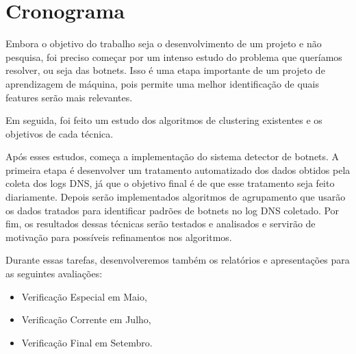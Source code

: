 \chapter{Cronograma}
Embora o objetivo do trabalho seja o desenvolvimento de um projeto e não pesquisa, foi preciso começar por um intenso estudo do problema que queríamos resolver, ou seja das botnets. Isso é uma etapa importante de um projeto de aprendizagem de máquina, pois permite uma melhor identificação de quais features serão mais relevantes.

Em seguida, foi feito um estudo dos algoritmos de clustering existentes e os objetivos de cada técnica.

Após esses estudos, começa a implementação do sistema detector de botnets. A primeira etapa é desenvolver um tratamento automatizado dos dados obtidos pela coleta dos logs DNS, já que o objetivo final é de que esse tratamento seja feito diariamente. Depois serão implementados algoritmos de agrupamento que usarão os dados tratados para identificar padrões de botnets no log DNS coletado. Por fim, os resultados dessas técnicas serão testados e analisados e servirão de motivação para possíveis refinamentos nos algoritmos.

Durante essas tarefas, desenvolveremos também os relatórios e apresentações para as seguintes avaliações:

\begin{itemize}  
\item Verificação Especial em Maio,
\item Verificação Corrente em Julho,
\item Verificação Final em Setembro.
\end{itemize}

